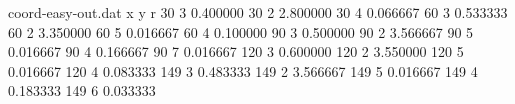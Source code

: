 
        \begin{filecontents}{coord-easy-out.dat}
             x  y  r 
	 30 3 0.400000 
	 30 2 2.800000 
	 30 4 0.066667 
	 60 3 0.533333 
	 60 2 3.350000 
	 60 5 0.016667 
	 60 4 0.100000 
	 90 3 0.500000 
	 90 2 3.566667 
	 90 5 0.016667 
	 90 4 0.166667 
	 90 7 0.016667 
	 120 3 0.600000 
	 120 2 3.550000 
	 120 5 0.016667 
	 120 4 0.083333 
	 149 3 0.483333 
	 149 2 3.566667 
	 149 5 0.016667 
	 149 4 0.183333 
	 149 6 0.033333 

        \end{filecontents}
        
